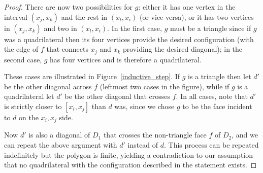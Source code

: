 \documentclass[11pt]{article}
\theoremstyle{remark}
\theoremstyle{definition}
\begin{document}
\begin{proof}
There are now two possibilities for $g$: either it has one vertex in the interval $(x_j, x_k)$ and the rest in $(x_l, x_i)$ (or vice versa), or it has two vertices in $(x_j, x_k)$ and two in $(x_l, x_i)$. In the first case, $g$ must be a triangle since if $g$ was a quadrilateral then its four vertices provide the desired configuration (with the edge of $f$ that connects $x_j$ and $x_k$ providing the desired diagonal); in the second case, $g$ has four vertices and is therefore a quadrilateral.

These cases are illustrated in Figure~\ref{inductive_step}. If $g$ is a triangle then let $d'$ be the other diagonal across $f$ (leftmost two cases in the figure), while if $g$ is a quadrilateral let $d'$ be the other diagonal that crosses $f$. In all cases, note that $d'$ is strictly closer to $[x_i,x_j]$ than $d$ was, since we chose $g$ to be the face incident to $d$ on the $x_i,x_j$ side.

Now $d'$ is also a diagonal of $D_1$ that crosses the non-triangle face $f$ of $D_2$, and we can repeat the above argument with $d'$ instead of $d$. This process can be repeated indefinitely but the polygon is finite, yielding a contradiction to our assumption that no quadrilateral with the configuration described in the statement exists.
\end{proof}
\end{document}
